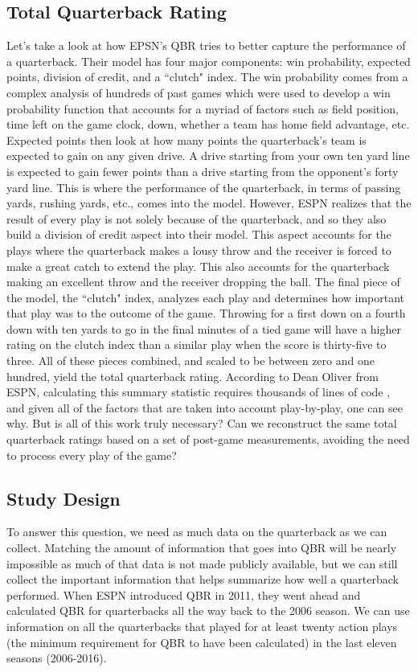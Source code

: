 \documentclass[12pt]{article}\usepackage[]{graphicx}\usepackage[]{color}
\begin{document}
\subsection{Total Quarterback Rating}
Let's take a look at how EPSN's QBR tries to better capture the performance of a quarterback. Their model has four major components: win probability, expected points, division of credit, and a ``clutch" index. The win probability comes from a complex analysis of hundreds of past games which were used to develop a win probability function that accounts for a myriad of factors such as field position, time left on the game clock, down, whether a team has home field advantage, etc. Expected points then look at how many points the quarterback's team is expected to gain on any given drive. A drive starting from your own ten yard line is expected to gain fewer points than a drive starting from the opponent's forty yard line. This is where the performance of the quarterback, in terms of passing yards, rushing yards, etc., comes into the model. However, ESPN realizes that the result of every play is not solely because of the quarterback, and so they also build a division of credit aspect into their model. This aspect accounts for the plays where the quarterback makes a lousy throw and the receiver is forced to make a great catch to extend the play. This also accounts for the quarterback making an excellent throw and the receiver dropping the ball. The final piece of the model, the ``clutch" index, analyzes each play and determines how important that play was to the outcome of the game. Throwing for a first down on a fourth down with ten yards to go in the final minutes of a tied game will have a higher rating on the clutch index than a similar play when the score is thirty-five to three. All of these pieces combined, and scaled to be between zero and one hundred, yield the total quarterback rating. According to Dean Oliver from ESPN, calculating this summary statistic requires thousands of lines of code \cite{qbr1}, and given all of the factors that are taken into account play-by-play, one can see why. But is all of this work truly necessary? Can we reconstruct the same total quarterback ratings based on a set of post-game measurements, avoiding the need to process every play of the game?

\subsection{Study Design}
To answer this question, we need as much data on the quarterback as we can collect. Matching the amount of information that goes into QBR will be nearly impossible as much of that data is not made publicly available, but we can still collect the important information that helps summarize how well a quarterback performed. When ESPN introduced QBR in 2011, they went ahead and calculated QBR for quarterbacks all the way back to the 2006 season. We can use information on all the quarterbacks that played for at least twenty action plays (the minimum requirement for QBR to have been calculated) in the last eleven seasons (2006-2016).
\end{document}
